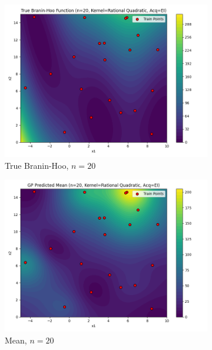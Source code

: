 \documentclass[a4paper,12pt]{article}
\begin{document}
\begin{figure}[H]
\begin{subfigure}{0.3\textwidth}
  \includegraphics[width=\linewidth]{Task-02/images/true_function_rational_quadratic_n20_EI.png}
  \caption{True Branin-Hoo, $n=20$}
\end{subfigure}
\begin{subfigure}{0.3\textwidth}
    \includegraphics[width=\linewidth]{Task-02/images/gp_mean_rational_quadratic_n20_EI.png}
    \caption{Mean, $n=20$}
\end{subfigure}
\begin{subfigure}{0.3\textwidth}

\end{subfigure}
\end{figure}
\end{document}
